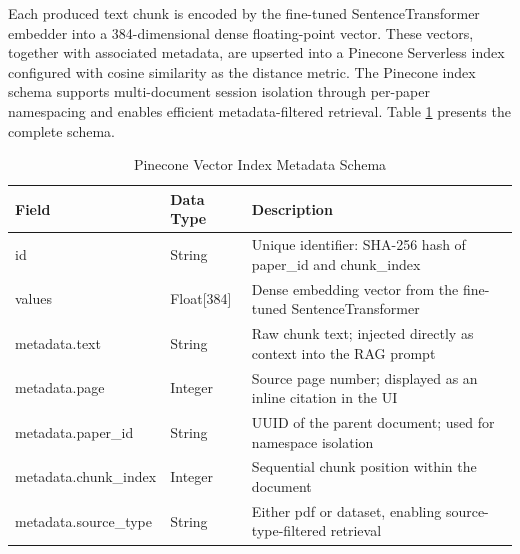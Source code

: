 Each produced text chunk is encoded by the fine-tuned SentenceTransformer embedder into a 384-dimensional dense floating-point vector. These vectors, together with associated metadata, are upserted into a Pinecone Serverless index configured with cosine similarity as the distance metric. The Pinecone index schema supports multi-document session isolation through per-paper namespacing and enables efficient metadata-filtered retrieval. Table \ref{tab:pinecone} presents the complete schema.

\begin{table}[H]

\centering

\caption{Pinecone Vector Index Metadata Schema}

\label{tab:pinecone}

\begin{tabular}{|p{3cm}|p{2.5cm}|p{7cm}|}

\hline

\textbf{Field} & \textbf{Data Type} & \textbf{Description} \\

\hline

id & String & Unique identifier: SHA-256 hash of paper\_id and chunk\_index \\

\hline

values & Float[384] & Dense embedding vector from the fine-tuned SentenceTransformer \\

\hline

metadata.text & String & Raw chunk text; injected directly as context into the RAG prompt \\

\hline

metadata.page & Integer & Source page number; displayed as an inline citation in the UI \\

\hline

metadata.paper\_id & String & UUID of the parent document; used for namespace isolation \\

\hline

metadata.chunk\_index & Integer & Sequential chunk position within the document \\

\hline

metadata.source\_type & String & Either pdf or dataset, enabling source-type-filtered retrieval \\

\hline

\end{tabular}

\end{table}

